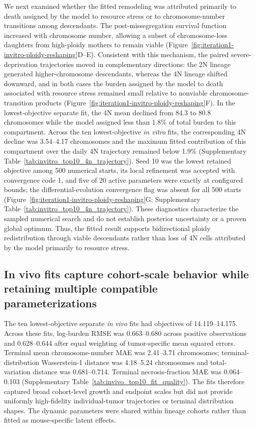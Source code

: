 \documentclass[11pt]{article}
\begin{document}
We next examined whether the fitted remodeling was attributed primarily to death assigned by the model to resource stress or to chromosome-number transitions among descendants. The post-missegregation survival function increased with chromosome number, allowing a subset of chromosome-loss daughters from high-ploidy mothers to remain viable (Figure~\ref{fig:iteration1-invitro-ploidy-reshaping}D--E). Consistent with this mechanism, the paired severe-deprivation trajectories moved in complementary directions: the 2N lineage generated higher-chromosome descendants, whereas the 4N lineage shifted downward, and in both cases the burden assigned by the model to death associated with resource stress remained small relative to nonviable chromosome-transition products (Figure~\ref{fig:iteration1-invitro-ploidy-reshaping}F). In the lowest-objective separate fit, the 4N mean declined from 84.3 to 80.8 chromosomes while the model assigned less than 1.8\% of total burden to this compartment. Across the ten lowest-objective \textit{in vitro} fits, the corresponding 4N decline was 3.54--4.17 chromosomes and the maximum fitted contribution of this compartment over the daily 4N trajectory remained below 1.9\% (Supplementary Table~\ref{tab:invitro_top10_4n_trajectory}). Seed 10 was the lowest retained objective among 500 numerical starts, its local refinement was accepted with convergence code 1, and five of 20 active parameters were exactly at configured bounds; the differential-evolution convergence flag was absent for all 500 starts (Figure~\ref{fig:iteration1-invitro-ploidy-reshaping}G; Supplementary Table~\ref{tab:invitro_top10_4n_trajectory}). These diagnostics characterize the sampled numerical search and do not establish posterior uncertainty or a proven global optimum. Thus, the fitted result supports bidirectional ploidy redistribution through viable descendants rather than loss of 4N cells attributed by the model primarily to resource stress.

\subsection*{In vivo fits capture cohort-scale behavior while retaining multiple compatible parameterizations}

The ten lowest-objective separate \textit{in vivo} fits had objectives of 14.119--14.175. Across these fits, log-burden RMSE was 0.663--0.680 across positive observations and 0.628--0.644 after equal weighting of tumor-specific mean squared errors. Terminal mean chromosome-number MAE was 2.41--3.71 chromosomes; terminal-distribution Wasserstein-1 distance was 4.18--5.24 chromosomes and total-variation distance was 0.681--0.714. Terminal necrosis-fraction MAE was 0.064--0.103 (Supplementary Table~\ref{tab:invivo_top10_fit_quality}). The fits therefore captured broad cohort-level growth and endpoint scales but did not provide uniformly high-fidelity individual-tumor trajectories or terminal distribution shapes. The dynamic parameters were shared within lineage cohorts rather than fitted as mouse-specific latent effects.
\end{document}
